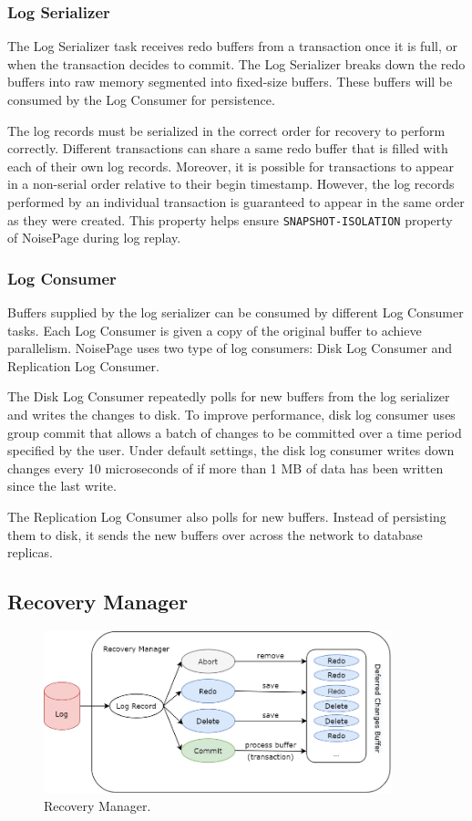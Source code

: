 \documentclass[12pt]{cmuthesis}
\begin{document}
\subsubsection{Log Serializer}
The Log Serializer task receives redo buffers from a transaction once it is full, or when the transaction decides to commit. The Log Serializer breaks down the redo buffers into raw memory segmented into fixed-size buffers. These buffers will be consumed by the Log Consumer for persistence.

The log records must be serialized in the correct order for recovery to perform correctly. Different transactions can share a same redo buffer that is filled with each of their own log records. Moreover, it is possible for transactions to appear in a non-serial order relative to their begin timestamp. However, the log records performed by an individual transaction is guaranteed to appear in the same order as they were created. This property helps ensure \texttt{SNAPSHOT-ISOLATION} property of NoisePage during log replay.
\subsubsection{Log Consumer}
Buffers supplied by the log serializer can be consumed by different Log Consumer tasks. Each Log Consumer is given a copy of the original buffer to achieve parallelism. NoisePage uses two type of log consumers: Disk Log Consumer and Replication Log Consumer.

The Disk Log Consumer repeatedly polls for new buffers from the log serializer and writes the changes to disk. To improve performance, disk log consumer uses group commit that allows a batch of changes to be committed over a time period specified by the user. Under default settings, the disk log consumer writes down changes every 10 microseconds of if more than 1 MB of data has been written since the last write.

The Replication Log Consumer also polls for new buffers. Instead of persisting them to disk, it sends the new buffers over across the network to database replicas.

\subsection{Recovery Manager}
\begin{figure}[t!]
\centering
\includegraphics[width=0.9\textwidth]{images/RecoveryManager.png}
\caption{Recovery Manager.}
\label{fig:recovery_manager}
\end{figure}
\end{document}
